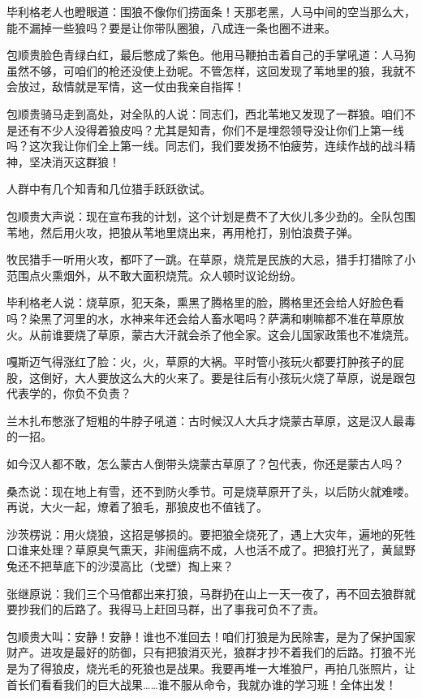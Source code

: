 \par 毕利格老人也瞪眼道：围狼不像你们捞面条！天那老黑，人马中间的空当那么大，能不漏掉一些狼吗？要是让你带队圈狼，八成连一条也圈不进来。
\par 包顺贵脸色青绿白红，最后憋成了紫色。他用马鞭拍击着自己的手掌吼道：人马狗虽然不够，可咱们的枪还没使上劲呢。不管怎样，这回发现了苇地里的狼，我就不会放过，敌情就是军情，这一仗由我亲自指挥！
\par 包顺贵骑马走到高处，对全队的人说：同志们，西北苇地又发现了一群狼。咱们不是还有不少人没得着狼皮吗？尤其是知青，你们不是埋怨领导没让你们上第一线吗？这次我让你们全上第一线。同志们，我们要发扬不怕疲劳，连续作战的战斗精神，坚决消灭这群狼！
\par 人群中有几个知青和几位猎手跃跃欲试。
\par 包顺贵大声说：现在宣布我的计划，这个计划是费不了大伙儿多少劲的。全队包围苇地，然后用火攻，把狼从苇地里烧出来，再用枪打，别怕浪费子弹。
\par 牧民猎手一听用火攻，都吓了一跳。在草原，烧荒是民族的大忌，猎手打猎除了小范围点火熏烟外，从不敢大面积烧荒。众人顿时议论纷纷。
\par 毕利格老人说：烧草原，犯天条，熏黑了腾格里的脸，腾格里还会给人好脸色看吗？染黑了河里的水，水神来年还会给人畜水喝吗？萨满和喇嘛都不准在草原放火。从前谁要烧了草原，蒙古大汗就会杀了他全家。这会儿国家政策也不准烧荒。
\par 嘎斯迈气得涨红了脸：火，火，草原的大祸。平时管小孩玩火都要打肿孩子的屁股，这倒好，大人要放这么大的火来了。要是往后有小孩玩火烧了草原，说是跟包代表学的，你负不负责？
\par 兰木扎布憋涨了短粗的牛脖子吼道：古时候汉人大兵才烧蒙古草原，这是汉人最毒的一招。
\par 如今汉人都不敢，怎么蒙古人倒带头烧蒙古草原了？包代表，你还是蒙古人吗？
\par 桑杰说：现在地上有雪，还不到防火季节。可是烧草原开了头，以后防火就难喽。再说，大火一起，燎着了狼毛，那狼皮也不值钱了。
\par 沙茨楞说：用火烧狼，这招是够损的。要把狼全烧死了，遇上大灾年，遍地的死牲口谁来处理？草原臭气熏天，非闹瘟病不成，人也活不成了。把狼打光了，黄鼠野兔还不把草底下的沙漠高比（戈壁）掏上来？
\par 张继原说：我们三个马倌都出来打狼，马群扔在山上一天一夜了，再不回去狼群就要抄我们的后路了。我得马上赶回马群，出了事我可负不了责。
\par 包顺贵大叫：安静！安静！谁也不准回去！咱们打狼是为民除害，是为了保护国家财产。进攻是最好的防御，只有把狼消灭光，狼群才抄不着我们的后路。打狼不光是为了得狼皮，烧光毛的死狼也是战果。我要再堆一大堆狼尸，再拍几张照片，让首长们看看我们的巨大战果……谁不服从命令，我就办谁的学习班！全体出发！
